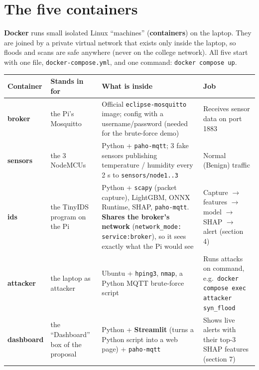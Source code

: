 \documentclass[11pt]{article}
\begin{document}
\section{The five containers}
\textbf{Docker} runs small isolated Linux ``machines'' (\textbf{containers}) on the laptop. They are joined by a private virtual network that exists
only inside the laptop, so floods and scans are safe anywhere (never on the college network). All five start with one file,
\texttt{docker-compose.yml}, and one command: \texttt{docker compose up}.

\begin{longtable}{@{}>{\raggedright}p{2.2cm} >{\raggedright}p{2.6cm} >{\raggedright}p{5.6cm} >{\raggedright\arraybackslash}p{4.8cm}@{}}
\toprule
\textbf{Container} & \textbf{Stands in for} & \textbf{What is inside} & \textbf{Job} \\
\midrule
\endhead
\textbf{broker} & the Pi's Mosquitto & Official \texttt{eclipse-mosquitto} image; config with a username/password (needed for the brute-force demo) & Receives sensor data on port 1883 \\
\textbf{sensors} & the 3 NodeMCUs & Python + \texttt{paho-mqtt}; 3 fake sensors publishing temperature / humidity every 2 s to \texttt{sensors/node1..3} & Normal (Benign) traffic \\
\textbf{ids} & the TinyIDS program on the Pi & Python + \texttt{scapy} (packet capture), LightGBM, ONNX Runtime, SHAP, \texttt{paho-mqtt}. \textbf{Shares the broker's network} (\texttt{network\_mode: service:broker}), so it sees exactly what the Pi would see & Capture $\rightarrow$ features $\rightarrow$ model $\rightarrow$ SHAP $\rightarrow$ alert (section 4) \\
\textbf{attacker} & the laptop as attacker & Ubuntu + \texttt{hping3}, \texttt{nmap}, a Python MQTT brute-force script & Runs attacks on command, e.g.\ \texttt{docker compose exec attacker syn\_flood} \\
\textbf{dashboard} & the ``Dashboard'' box of the proposal & Python + \textbf{Streamlit} (turns a Python script into a web page) + \texttt{paho-mqtt} & Shows live alerts with their top-3 SHAP features (section 7) \\
\bottomrule
\end{longtable}

\newpage
\end{document}
